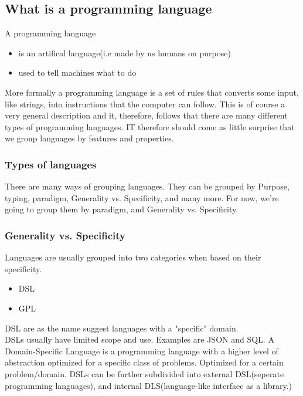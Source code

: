 \documentclass{article}
\begin{document}
    \subsection{What is a programming language}
        A programming language 
        \begin{itemize}
            \item is an artifical language(i.e made by us humans on purpose)
            \item used to tell machines what to do
        \end{itemize}
        More formally a programming language is a set of rules that converts some input, like strings, into instructions that the computer can follow.
        This is of course a very general description and it, therefore, follows that there are many different types of programming languages.
        IT therefore should come as little surprise that we group languages by features and properties. 
        \subsubsection{Types of languages}
        There are many ways of grouping languages. They can be grouped by Purpose, typing, paradigm, Generality vs. Specificity, and many more.
        For now, we're going to group them by paradigm, and Generality vs. Specificity.
        \subsubsection*{Generality vs. Specificity}
        Languages are usually grouped into two categories when based on their specificity.
        \begin{itemize}
            \item DSL
            \item GPL
        \end{itemize}

        \Gls{DSL} are as the name suggest languages with a "specific" domain.\\
        DSLs usually have limited scope and use. Examples are JSON and SQL.     
        A Domain-Specific Language is a programming language with a higher level of abstraction optimized for a specific class of problems. 
        Optimized for a certain problem/domain. 
        DSLs can be further subdivided into external DSL(seperate programming languages), and internal DLS(language-like interfaec as a library.)
\end{document}
